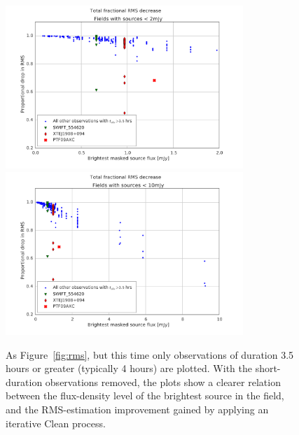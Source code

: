 \documentclass[5p,authoryear]{elsarticle}
\begin{document}
\begin{figure}[p]
\begin{center}  
  \includegraphics[width=0.8\textwidth]{../figures/rms_to_2mjy_4hrs}
  \includegraphics[width=0.8\textwidth]{../figures/rms_to_10mjy_4hrs}
  \caption[Fractional RMS decrease vs. brightest source flux for long-duration observations]{%
  \label{fig:rms_long_duration}
  As Figure~\ref{fig:rms}, but this time only observations of duration 3.5 hours or greater (typically 4 hours) are plotted. 
  With the short-duration observations removed, the plots show a clearer relation between the flux-density level of the brightest source in the field, and the RMS-estimation improvement gained by applying an iterative Clean process.
} 
\end{center} 
\end{figure}
\end{document}
